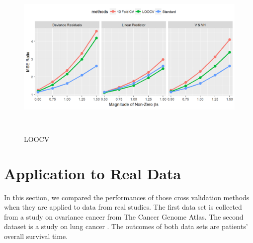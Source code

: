 
\begin{figure}[h]
    \centering
		\includegraphics[height= 8cm ]{./figures/figure_4.png}
    \caption{LOOCV}
\end{figure}	



\section{Application to Real Data}

\par In this section, we compared the performances of those cross validation methods when they are applied to data from real studies. The first data set is collected from a study on ovariance cancer from The Cancer Genome Atlas. The second dataset is a study on lung cancer \citep{shedden2008gene}. The outcomes of both data sets are patients' overall survival time.

